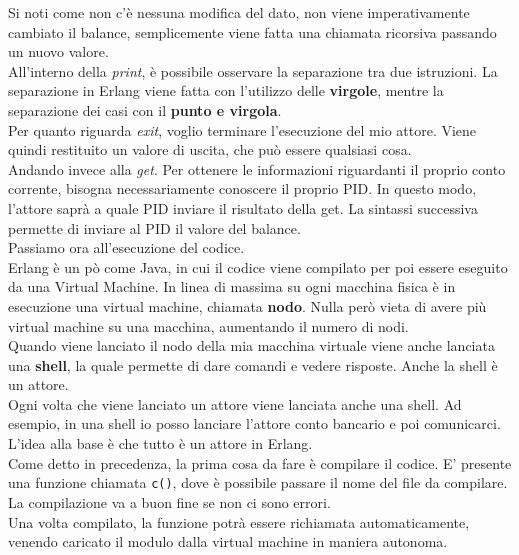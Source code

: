\documentclass{article}
\begin{document}
Si noti come non c'è nessuna modifica del dato, non viene imperativamente cambiato il balance, semplicemente viene fatta una chiamata ricorsiva passando un nuovo valore.\vspace{14pt}\\
All'interno della \textit{print}, è possibile osservare la separazione tra due istruzioni. La separazione in Erlang viene fatta con l'utilizzo delle \textbf{virgole}, mentre la separazione dei casi con il \textbf{punto e virgola}.\vspace{14pt}\\
Per quanto riguarda \textit{exit}, voglio terminare l'esecuzione del mio attore. Viene quindi restituito un valore di uscita, che può essere qualsiasi cosa.\vspace{14pt}\\
Andando invece alla \textit{get}. Per ottenere le informazioni riguardanti il proprio conto corrente, bisogna necessariamente conoscere il proprio PID. In questo modo, l'attore saprà a quale PID inviare il risultato della get. La sintassi successiva permette di inviare al PID il valore del balance.\vspace{14pt}\\
Passiamo ora all'esecuzione del codice.\\
Erlang è un pò come Java, in cui il codice viene compilato per poi essere eseguito da una Virtual Machine. In linea di massima su ogni macchina fisica è in esecuzione una virtual machine, chiamata \textbf{nodo}. Nulla però vieta di avere più virtual machine su una macchina, aumentando il numero di nodi.\vspace{14pt}\\
Quando viene lanciato il nodo della mia macchina virtuale viene anche lanciata una \textbf{shell}, la quale permette di dare comandi e vedere risposte. Anche la shell è un attore.\\
Ogni volta che viene lanciato un attore viene lanciata anche una shell. Ad esempio, in una shell io posso lanciare l'attore conto bancario e poi comunicarci.\\
L'idea alla base è che tutto è un attore in Erlang.\vspace{14pt}\\
Come detto in precedenza, la prima cosa da fare è compilare il codice. E' presente una funzione chiamata \texttt{c()}, dove è possibile passare il nome del file da compilare. La compilazione va a buon fine se non ci sono errori.\\
Una volta compilato, la funzione potrà essere richiamata automaticamente, venendo caricato il modulo dalla virtual machine in maniera autonoma.\vspace{14pt}\\
\end{document}

